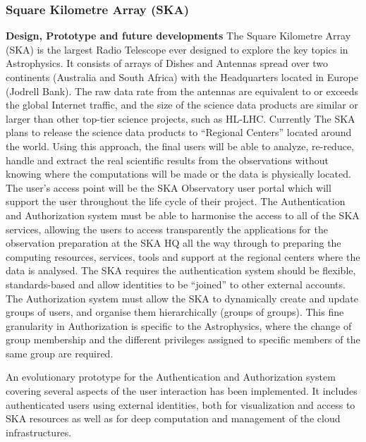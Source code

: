 \documentclass[fleqn,10pt]{wlscirep}
\begin{document}
{\subsubsection{Square Kilometre Array (SKA)}
\textbf{Design, Prototype and future developments}
The Square Kilometre Array (SKA) is the largest Radio Telescope ever designed to explore the key  topics in Astrophysics. It consists of arrays of Dishes and Antennas spread over two continents (Australia and South Africa) with the Headquarters located in Europe (Jodrell Bank). The  raw data rate from the antennas are equivalent to or exceeds the global Internet traffic, and the size of the science data products are similar or larger than other top-tier science projects, such as HL-LHC.  Currently The SKA plans to release the science data products to “Regional Centers” located around the world. Using this approach, the final users will be able to analyze, re-reduce, handle and extract the real scientific results from the observations without knowing where the computations will be made or the data is physically located. The user’s access point will be the SKA Observatory user portal which will support the user throughout the life cycle of their project.  The Authentication and Authorization system must be able to harmonise the access to all of the SKA services, allowing the users  to access transparently the applications for the observation preparation at the SKA HQ all the way through to preparing the computing resources, services, tools and support at the regional centers where the data is analysed. The SKA requires  the authentication system should be flexible, standards-based and allow identities to be  “joined” to other external accounts. The Authorization system must allow the SKA to dynamically create and update groups of users, and organise them  hierarchically  (groups of groups). This fine granularity in Authorization is specific to the Astrophysics, where the change of group membership and the different privileges assigned to specific members of the same group are required. 

An evolutionary prototype for the Authentication and Authorization system covering several aspects of the user interaction has been implemented. It includes authenticated users using external identities, both for visualization and access to SKA resources as well as for deep computation and management of the cloud infrastructures. 

}
\end{document}
